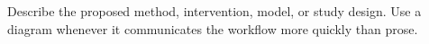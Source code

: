 
Describe the proposed method, intervention, model, or study design. Use a
diagram whenever it communicates the workflow more quickly than prose.

